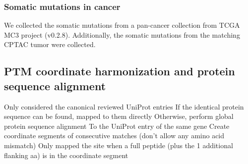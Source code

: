 \subsubsection{Somatic mutations in cancer}
We collected the somatic mutations from a pan-cancer collection from TCGA MC3 project \cite{ellrottk_tcga:MC3MutationCalling2018} (v0.2.8). Additionally, the somatic mutations from the matching CPTAC tumor were collected.


\subsection{PTM coordinate harmonization and protein sequence alignment}
Only considered the canonical reviewed UniProt entries
If the identical protein sequence can be found, mapped to them directly
Otherwise, perform global protein sequence alignment
To the UniProt entry of the same gene
Create coordinate segments of consecutive matches (don't allow any amino acid mismatch)
Only mapped the site when a full peptide (plus the 1 additional flanking aa) is in the coordinate segment



